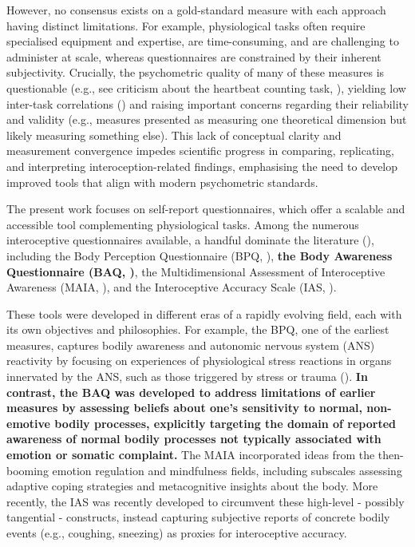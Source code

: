 \documentclass[
  man,
  floatsintext,
  longtable,
  nolmodern,
  notxfonts,
  notimes,
  mask,
  colorlinks=true,linkcolor=blue,citecolor=blue,urlcolor=blue]{apa7}
\begin{document}
However, no consensus exists on a gold-standard measure with each
approach having distinct limitations. For example, physiological tasks
often require specialised equipment and expertise, are time-consuming,
and are challenging to administer at scale, whereas questionnaires are
constrained by their inherent subjectivity. Crucially, the psychometric
quality of many of these measures is questionable (e.g., see criticism
about the heartbeat counting task,
),
yielding low inter-task correlations
() and raising
important concerns regarding their reliability and validity (e.g.,
measures presented as measuring one theoretical dimension but likely
measuring something else). This lack of conceptual clarity and
measurement convergence impedes scientific progress in comparing,
replicating, and interpreting interoception-related findings,
emphasising the need to develop improved tools that align with modern
psychometric standards.

The present work focuses on self-report questionnaires, which offer a
scalable and accessible tool complementing physiological tasks. Among
the numerous interoceptive questionnaires available, a handful dominate
the literature (), including the Body Perception Questionnaire (BPQ,
), \textbf{the Body
Awareness Questionnaire (BAQ, )}, the Multidimensional Assessment of Interoceptive Awareness
(MAIA, ), and the Interoceptive Accuracy Scale (IAS,
).

These tools were developed in different eras of a rapidly evolving
field, each with its own objectives and philosophies. For example, the
BPQ, one of the earliest measures, captures bodily awareness and
autonomic nervous system (ANS) reactivity by focusing on experiences of
physiological stress reactions in organs innervated by the ANS, such as
those triggered by stress or trauma
(). \textbf{In
contrast, the BAQ was developed to address limitations of earlier
measures by assessing beliefs about one's sensitivity to normal,
non-emotive bodily processes, explicitly targeting the domain of
reported awareness of normal bodily processes not typically associated
with emotion or somatic complaint.} The MAIA incorporated ideas from the
then-booming emotion regulation and mindfulness fields, including
subscales assessing adaptive coping strategies and metacognitive
insights about the body. More recently, the IAS was recently developed
to circumvent these high-level - possibly tangential - constructs,
instead capturing subjective reports of concrete bodily events (e.g.,
coughing, sneezing) as proxies for interoceptive accuracy.
\end{document}

